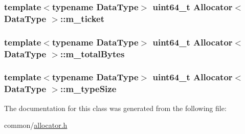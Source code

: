 \hypertarget{classAllocator_a81d11637a666e7f3822ac78fa43d1b88}{
\subsubsection[{m\-\_\-ticket}]{\setlength{\rightskip}{0pt plus 5cm}template$<$typename Data\-Type$>$ uint64\-\_\-t {\bf Allocator}$<$ Data\-Type $>$\-::m\-\_\-ticket\hspace{0.3cm}{\ttfamily [private]}}}\label{classAllocator_a81d11637a666e7f3822ac78fa43d1b88}
\hypertarget{classAllocator_aea41e7ddad87fc724440019ca0065949}{
\subsubsection[{m\-\_\-total\-Bytes}]{\setlength{\rightskip}{0pt plus 5cm}template$<$typename Data\-Type$>$ uint64\-\_\-t {\bf Allocator}$<$ Data\-Type $>$\-::m\-\_\-total\-Bytes\hspace{0.3cm}{\ttfamily [private]}}}\label{classAllocator_aea41e7ddad87fc724440019ca0065949}
\hypertarget{classAllocator_a569f32c5cfab86005b7a40ae966d3f5c}{
\subsubsection[{m\-\_\-type\-Size}]{\setlength{\rightskip}{0pt plus 5cm}template$<$typename Data\-Type$>$ uint64\-\_\-t {\bf Allocator}$<$ Data\-Type $>$\-::m\-\_\-type\-Size\hspace{0.3cm}{\ttfamily [private]}}}\label{classAllocator_a569f32c5cfab86005b7a40ae966d3f5c}


The documentation for this class was generated from the following file\-:\begin{DoxyCompactItemize}
\item 
common/\hyperlink{allocator_8h}{allocator.\-h}\end{DoxyCompactItemize}
